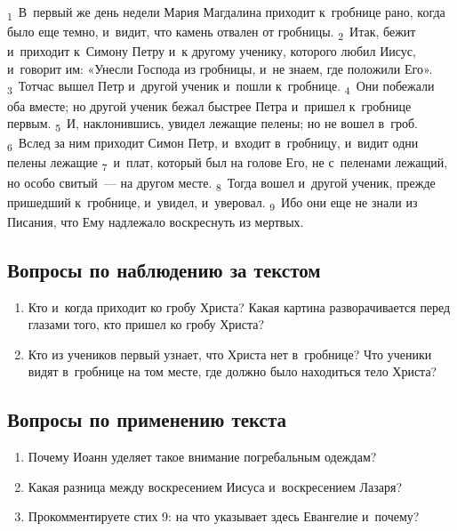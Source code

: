 \documentclass[a4paper,12pt]{article}
\begin{document}
\textsubscript{1}~В~первый же день недели Мария Магдалина приходит к~гробнице рано, когда было еще темно, и~видит, что камень отвален от гробницы. \textsubscript{2}~Итак, бежит и~приходит к~Симону Петру и~к другому ученику, которого любил Иисус, и~говорит им: «Унесли Господа из гробницы, и~не знаем, где положили Его». \textsubscript{3}~Тотчас вышел Петр и~другой ученик и~пошли к~гробнице. \textsubscript{4}~Они побежали оба вместе; но другой ученик бежал быстрее Петра и~пришел к~гробнице первым. \textsubscript{5}~И, наклонившись, увидел лежащие пелены; но не вошел в~гроб. \textsubscript{6}~Вслед за ним приходит Симон Петр, и~входит в~гробницу, и~видит одни пелены лежащие \textsubscript{7}~и~плат, который был на голове Его, не с~пеленами лежащий, но особо свитый~--- на другом месте. \textsubscript{8}~Тогда вошел и~другой ученик, прежде пришедший к~гробнице, и~увидел, и~уверовал. \textsubscript{9}~Ибо они еще не знали из Писания, что Ему надлежало воскреснуть из мертвых. 

\subsection*{Вопросы по наблюдению за текстом}
\begin{enumerate}
    \item Кто и~когда приходит ко гробу Христа? Какая картина разворачивается перед глазами того, кто пришел ко гробу Христа? 
    
    \myline
    
    \myline
    \item Кто из учеников первый узнает, что Христа нет в~гробнице? Что ученики видят в~гробнице на том месте, где должно было находиться тело Христа? 
    
    \myline
    
    \myline
\end{enumerate}

\subsection*{Вопросы по применению текста} 
\begin{enumerate}
    \item Почему Иоанн уделяет такое внимание погребальным одеждам? 
    
    \myline
    
    \myline
    \item Какая разница между воскресением Иисуса и~воскресением Лазаря? 
    
    \myline
    
    \myline
    \item Прокомментируете стих 9: на что указывает здесь Евангелие и~почему?
    
    \myline
    
    \myline
\end{enumerate}
\end{document}
